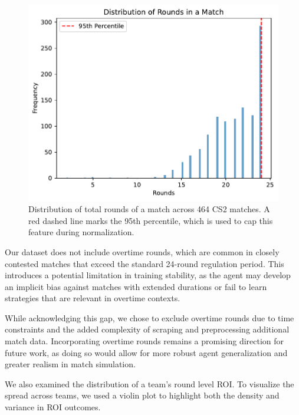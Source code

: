 \documentclass[sigconf]{acmart}
\begin{document}
\begin{figure}[ht]
  \centering
  \includegraphics[width=0.9\linewidth]{total_rounds_distribution.pdf}
  \caption{Distribution of total rounds of a match across 464 CS2 matches. A red dashed line marks the 95th percentile, which is used to cap this feature during normalization.}
  \label{fig:round_duration_dist}
\end{figure}

\smallskip

Our dataset does not include overtime rounds, which are common in closely contested matches that exceed the standard 24-round regulation period. This introduces a potential limitation in training stability, as the agent may develop an implicit bias against matches with extended durations or fail to learn strategies that are relevant in overtime contexts.

While acknowledging this gap, we chose to exclude overtime rounds due to time constraints and the added complexity of scraping and preprocessing additional match data. Incorporating overtime rounds remains a promising direction for future work, as doing so would allow for more robust agent generalization and greater realism in match simulation.

We also examined the distribution of a team's round level ROI. To visualize the spread across teams, we used a violin plot to highlight both the density and variance in ROI outcomes.

\smallskip
\end{document}
